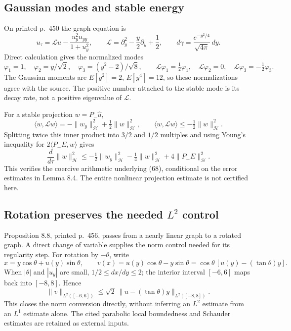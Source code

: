 \documentclass[10pt]{article}
\begin{document}
\subsection*{Gaussian modes and stable energy}
On printed p. 450 the graph equation is \[u_\tau=\mathcal Lu-\frac{u_y^2u_{yy}}{1+u_y^2},
 \qquad \mathcal L=\partial_y^2-\frac y2\partial_y+\frac12,
 \qquad d\gamma=\frac{e^{-y^2/4}}{\sqrt{4\pi}}\,dy.\] Direct calculation gives the normalized modes \[\varphi_1=1,\quad \varphi_2=y/\sqrt2,\quad
 \varphi_3=(y^2-2)/\sqrt8,\qquad
 \mathcal L\varphi_1=\tfrac12\varphi_1,\quad
 \mathcal L\varphi_2=0,\quad
 \mathcal L\varphi_3=-\tfrac12\varphi_3.\] The Gaussian moments are \(E[y^2]=2\), \(E[y^4]=12\), so these normalizations agree with the source. The positive number attached to the stable mode is its decay rate, not a positive eigenvalue of \(\mathcal L\).\par
For a stable projection \(w=P_-\widehat u\), \[\langle w,\mathcal Lw\rangle
 =-\|w_y\|_{\mathcal H}^2+\tfrac12\|w\|_{\mathcal H}^2,
 \qquad
 \langle w,\mathcal Lw\rangle\le-\tfrac12\|w\|_{\mathcal H}^2.\] Splitting twice this inner product into \(3/2\) and \(1/2\) multiples and using Young’s inequality for \(2\langle P_-E,w\rangle\) gives \[\frac d{d\tau}\|w\|_{\mathcal H}^2
 \le-\tfrac12\|w_y\|_{\mathcal H}^2
    -\tfrac14\|w\|_{\mathcal H}^2+4\|P_-E\|_{\mathcal H}^2.\] This verifies the coercive arithmetic underlying (68), conditional on the error estimates in Lemma 8.4. The entire nonlinear projection estimate is not certified here.\par
\subsection*{Rotation preserves the needed \(L^2\) control}
Proposition 8.8, printed p. 456, passes from a nearly linear graph to a rotated graph. A direct change of variable supplies the norm control needed for its regularity step. For rotation by \(-\theta\), write \[x=y\cos\theta+u(y)\sin\theta,\qquad
 v(x)=u(y)\cos\theta-y\sin\theta
      =\cos\theta\,[u(y)-(\tan\theta)y].\] When \(|\theta|\) and \(|u_y|\) are small, \(1/2\le dx/dy\le2\); the interior interval \([-6,6]\) maps back into \([-8,8]\). Hence \[\|v\|_{L^2([-6,6])}\le\sqrt2\,
 \|u-(\tan\theta)y\|_{L^2([-8,8])}.\] This closes the norm conversion directly, without inferring an \(L^2\) estimate from an \(L^1\) estimate alone. The cited parabolic local boundedness and Schauder estimates are retained as external inputs.\par
\end{document}
